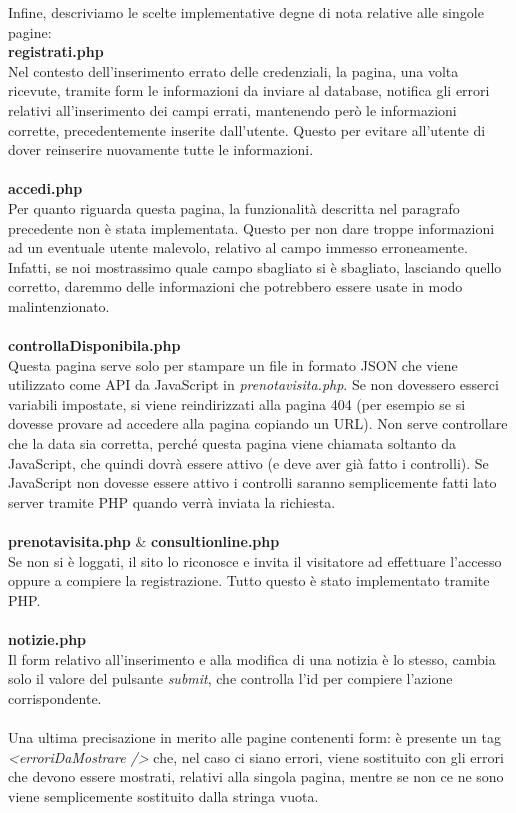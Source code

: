 Infine, descriviamo le scelte implementative degne di nota relative alle singole pagine: \\

\textbf{registrati.php} \\
Nel contesto dell'inserimento errato delle credenziali, la pagina, una volta ricevute, tramite form le informazioni da inviare al database, notifica gli errori relativi all'inserimento dei campi errati, mantenendo però le informazioni corrette, precedentemente inserite dall'utente. Questo per evitare all'utente di dover reinserire nuovamente tutte le informazioni. \\ \\

\textbf{accedi.php} \\
Per quanto riguarda questa pagina, la funzionalità descritta nel paragrafo precedente non è stata implementata. Questo per non dare troppe informazioni ad un eventuale utente malevolo, relativo al campo immesso erroneamente. Infatti, se noi mostrassimo quale campo sbagliato si è sbagliato, lasciando quello corretto, daremmo delle informazioni che potrebbero essere usate in modo malintenzionato. \\ \\

\textbf{controllaDisponibila.php} \\
Questa pagina serve solo per stampare un file in formato JSON che viene utilizzato come API da JavaScript in \textit{prenotavisita.php}. Se non dovessero esserci variabili impostate, si viene reindirizzati alla pagina 404 (per esempio se si dovesse provare ad accedere alla pagina copiando un URL).
Non serve controllare che la data sia corretta, perché questa pagina viene chiamata soltanto da JavaScript, che quindi dovrà essere attivo (e deve aver già fatto i controlli).
Se JavaScript non dovesse essere attivo i controlli saranno semplicemente fatti lato server tramite PHP quando verrà inviata la richiesta. \\ \\

\textbf{prenotavisita.php} \& \textbf{consultionline.php} \\
Se non si è loggati, il sito lo riconosce e invita il visitatore ad effettuare l'accesso oppure a compiere la registrazione. Tutto questo è stato implementato tramite PHP. \\ \\

\textbf{notizie.php} \\
Il form relativo all'inserimento e alla modifica di una notizia è lo stesso, cambia solo il valore del pulsante \textit{submit}, che controlla l'id per compiere l'azione corrispondente. \\ \\


Una ultima precisazione in merito alle pagine contenenti form: è presente un tag \textit{<erroriDaMostrare />} che, nel caso ci siano errori, viene sostituito con gli errori che devono essere mostrati, relativi alla singola pagina, mentre se non ce ne sono viene semplicemente sostituito dalla stringa vuota.







